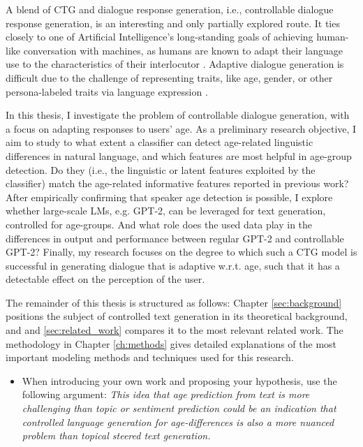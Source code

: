 A blend of CTG and dialogue response generation, i.e., controllable dialogue response generation, is an interesting and only partially explored route. It ties closely to one of Artificial Intelligence's long-standing goals of achieving human-like conversation with machines, as humans are known to adapt their language use to the characteristics of their interlocutor \citep{gallois2015communication}. Adaptive dialogue generation is difficult due to the challenge of representing traits, like age, gender, or other persona-labeled traits via language expression \citep{zheng2019personalized}.

In this thesis, I investigate the problem of controllable dialogue generation, with a focus on adapting responses to users' age. As a preliminary research objective, I aim to study to what extent a classifier can detect age-related linguistic differences in natural language, and which features are most helpful in age-group detection. Do they (i.e., the linguistic or latent features exploited by the classifier) match the age-related informative features reported in previous work? 
After empirically confirming that speaker age detection is possible, I explore whether large-scale LMs, e.g. GPT-2, can be leveraged for text generation, controlled for age-groups. And what role does the used data play in the differences in output and performance between regular GPT-2 and controllable GPT-2?
Finally, my research focuses on the degree to which such a CTG model is successful in generating dialogue that is adaptive w.r.t. age, such that it has a detectable effect on the perception of the user.

The remainder of this thesis is structured as follows: Chapter \ref{sec:background} positions the subject of controlled text generation in its theoretical background, and and \ref{sec:related_work} compares it to the most relevant related work. The methodology in Chapter \ref{ch:methods} gives detailed explanations of the most important modeling methods and techniques used for this research.



\begin{itemize}
    \item When introducing your own work and proposing your hypothesis, use the following argument: \textit{This idea that age prediction from text is more challenging than topic or sentiment prediction could be an indication that controlled language generation for age-differences is also a more nuanced problem than topical steered text generation.}
\end{itemize}
